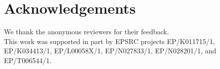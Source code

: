 \section*{Acknowledgements}
We thank the anonymous reviewers for their 
feedback.\\
This work was supported in part by EPSRC projects EP/K011715/1, EP/K034413/1, EP/L00058X/1, EP/N027833/1, EP/N028201/1, and EP/T006544/1.